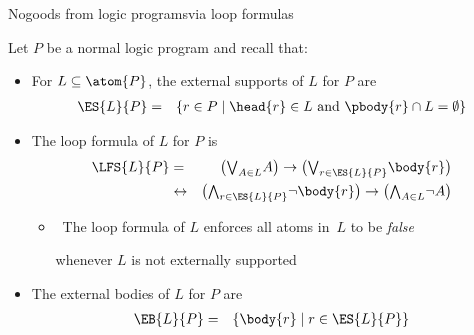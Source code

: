 \begin{frame}{Nogoods from logic programs}{via loop formulas}

  Let $P$ be a normal logic program and recall that:
  \begin{itemize}
  \item <1->
    For $L\subseteq\atom{P}$,
    the external supports of $L$ for $P$ are
    \begin{eqnarray*}
      \ES{L}{P}
      & = &
      \{r\in P\mid\head{r}\in L \text{ and } \pbody{r}\cap L=\emptyset\}
    \end{eqnarray*}

  \item <2->
    The loop formula of $L$ for $P$ is
    \begin{eqnarray*}
      \LFS{L}{P}
      & = &
      \big(
      \mbox{$\bigvee_{A\in L}$} A
      \big)
      \rightarrow
      \big(
      \mbox{$\bigvee_{r\in\ES{L}{P}}$}
      {\body{r}}
      \big)
      \\
      & \leftrightarrow &
      \big(
      \mbox{$\bigwedge_{r\in\ES{L}{P}}$}
      \neg%
      {\body{r}}
      \big)
      \rightarrow
      \big(
      \mbox{$\bigwedge_{A\in L}$}\neg A
      \big)
    \end{eqnarray*}
    \vspace*{-4mm}
    \begin{itemize}
    \item {} \
      The loop formula of $L$ enforces
      all atoms in~$L$ to be \emph{false}
      \par
      whenever $L$ is not externally supported
    \end{itemize}

  \item <3-> The external bodies of $L$ for $P$ are
    \begin{eqnarray*}
      \EB{L}{P} & = & \{\body{r} \mid r\in \ES{L}{P}\}
    \end{eqnarray*}
  \end{itemize}
\end{frame}
